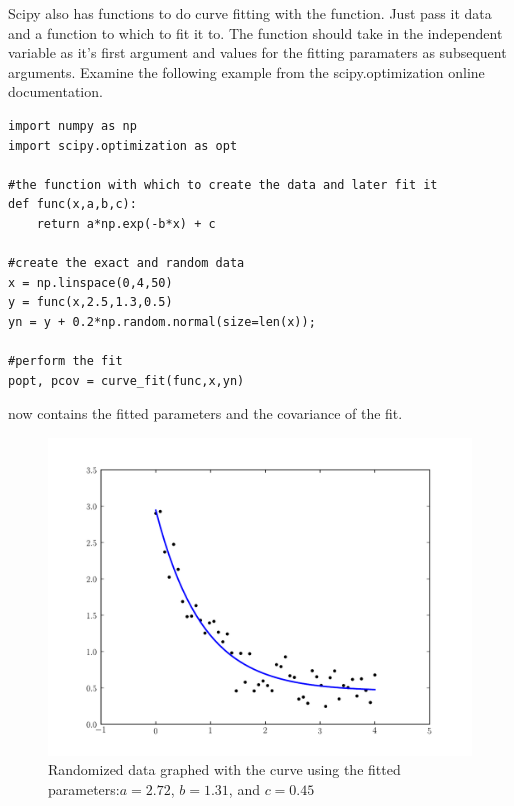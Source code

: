 Scipy also has functions to do curve fitting with the  function. Just pass it data and a function to which to fit it to. The function should take in the independent variable as it's first argument and values for the fitting paramaters as subsequent arguments.
Examine the following example from the scipy.optimization online documentation.
\begin{lstlisting}
import numpy as np
import scipy.optimization as opt

#the function with which to create the data and later fit it
def func(x,a,b,c):
    return a*np.exp(-b*x) + c

#create the exact and random data
x = np.linspace(0,4,50)
y = func(x,2.5,1.3,0.5)
yn = y + 0.2*np.random.normal(size=len(x));

#perform the fit
popt, pcov = curve_fit(func,x,yn)
\end{lstlisting}
 now contains the fitted parameters and  the covariance of the fit.
\begin{figure}
\includegraphics[width=\textwidth]{curve_fit.pdf}
\caption{Randomized data graphed with the curve using the fitted parameters:$a=2.72$,  $b=1.31$, and $c=0.45$ }
\label{opt:curve_fit}
\end{figure}
